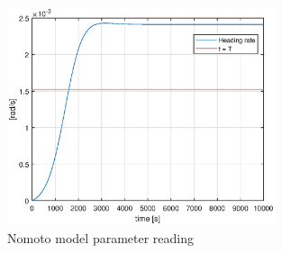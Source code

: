 \begin{figure}[H]
\centering
\includegraphics[width=0.7\textwidth]{nomoto-reading}
\caption{Nomoto model parameter reading}
\label{fig:nomoto_reading}
\end{figure}


